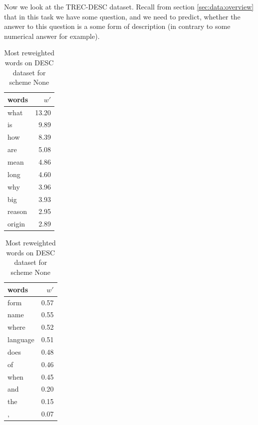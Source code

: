     Now we look at the TREC-DESC dataset. 
    Recall from section \ref{sec:data:overview} that in this task we have some question, and we need to predict, whether the answer to this question is a some form of description (in contrary to some numerical answer for example).
    
    
    

\begin{table}[H]
    \centering
    \begin{minipage}{.4\linewidth}
      \centering
        \begin{tabular}{lr}
\toprule
  words &   $w'$ \\
\midrule
   what &  13.20 \\
     is &   9.89 \\
    how &   8.39 \\
    are &   5.08 \\
   mean &   4.86 \\
   long &   4.60 \\
    why &   3.96 \\
    big &   3.93 \\
 reason &   2.95 \\
 origin &   2.89 \\
\bottomrule
\end{tabular}

    \end{minipage}
    \begin{minipage}{.4\linewidth}
      \centering
        \begin{tabular}{lr}
\toprule
    words &  $w'$ \\
\midrule
     form &  0.57 \\
     name &  0.55 \\
    where &  0.52 \\
 language &  0.51 \\
     does &  0.48 \\
       of &  0.46 \\
     when &  0.45 \\
      and &  0.20 \\
      the &  0.15 \\
        , &  0.07 \\
\bottomrule
\end{tabular}

    \end{minipage} 
    \caption{Most reweighted words on DESC dataset for scheme None}
    \label{tab:words:TREC:none}
\end{table}

